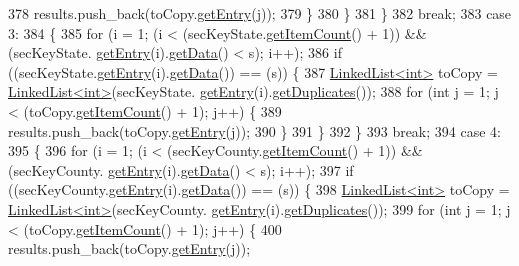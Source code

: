 \begin{DoxyCode}
378                 results.push\_back(toCopy.\hyperlink{classLinkedList_a341bfd7772c9d24d29eb7a7f3936915b}{getEntry}(j));
379             \}
380         \}
381     \}
382     \textcolor{keywordflow}{break};
383     \textcolor{keywordflow}{case} 3:
384     \{
385         \textcolor{keywordflow}{for} (i = 1; (i < (secKeyState.\hyperlink{classLinkedList_afc6635f854f48f2f126cf3b60d845220}{getItemCount}() + 1)) && (secKeyState.
      \hyperlink{classLinkedList_a341bfd7772c9d24d29eb7a7f3936915b}{getEntry}(i).\hyperlink{classSecKeySS_add52510d280d0ca89b653386500f08f5}{getData}() < s); i++);
386         \textcolor{keywordflow}{if} ((secKeyState.\hyperlink{classLinkedList_a341bfd7772c9d24d29eb7a7f3936915b}{getEntry}(i).\hyperlink{classSecKeySS_add52510d280d0ca89b653386500f08f5}{getData}()) == (s)) \{
387             \hyperlink{classLinkedList}{LinkedList<int>} toCopy = \hyperlink{classLinkedList}{LinkedList<int>}(secKeyState.
      \hyperlink{classLinkedList_a341bfd7772c9d24d29eb7a7f3936915b}{getEntry}(i).\hyperlink{classSecKeySS_aaae9db891cfcdc3f78d8a44145f4f08c}{getDuplicates}());
388             \textcolor{keywordflow}{for} (\textcolor{keywordtype}{int} j = 1; j < (toCopy.\hyperlink{classLinkedList_afc6635f854f48f2f126cf3b60d845220}{getItemCount}() + 1); j++) \{
389                 results.push\_back(toCopy.\hyperlink{classLinkedList_a341bfd7772c9d24d29eb7a7f3936915b}{getEntry}(j));
390             \}
391         \}
392     \}
393     \textcolor{keywordflow}{break};
394     \textcolor{keywordflow}{case} 4:
395     \{
396         \textcolor{keywordflow}{for} (i = 1; (i < (secKeyCounty.\hyperlink{classLinkedList_afc6635f854f48f2f126cf3b60d845220}{getItemCount}() + 1)) && (secKeyCounty.
      \hyperlink{classLinkedList_a341bfd7772c9d24d29eb7a7f3936915b}{getEntry}(i).\hyperlink{classSecKeySS_add52510d280d0ca89b653386500f08f5}{getData}() < s); i++);
397         \textcolor{keywordflow}{if} ((secKeyCounty.\hyperlink{classLinkedList_a341bfd7772c9d24d29eb7a7f3936915b}{getEntry}(i).\hyperlink{classSecKeySS_add52510d280d0ca89b653386500f08f5}{getData}()) == (s)) \{
398             \hyperlink{classLinkedList}{LinkedList<int>} toCopy = \hyperlink{classLinkedList}{LinkedList<int>}(secKeyCounty.
      \hyperlink{classLinkedList_a341bfd7772c9d24d29eb7a7f3936915b}{getEntry}(i).\hyperlink{classSecKeySS_aaae9db891cfcdc3f78d8a44145f4f08c}{getDuplicates}());
399             \textcolor{keywordflow}{for} (\textcolor{keywordtype}{int} j = 1; j < (toCopy.\hyperlink{classLinkedList_afc6635f854f48f2f126cf3b60d845220}{getItemCount}() + 1); j++) \{
400                 results.push\_back(toCopy.\hyperlink{classLinkedList_a341bfd7772c9d24d29eb7a7f3936915b}{getEntry}(j));

\end{DoxyCode}
